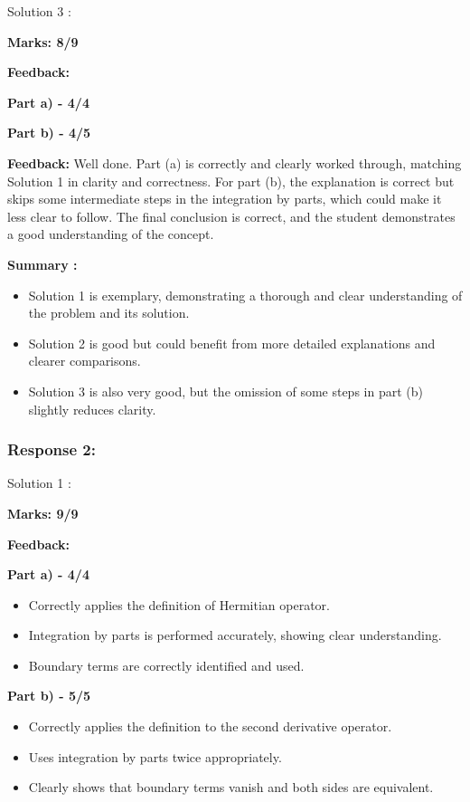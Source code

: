\documentclass[a4paper,11pt]{article}
\begin{document}
Solution 3 :

\textbf{Marks: 8/9}

\textbf{Feedback:}

\textbf{Part a) - 4/4}


\textbf{Part b) - 4/5}


\textbf{Feedback:}
Well done. Part (a) is correctly and clearly worked through, matching Solution 1 in clarity and correctness. For part (b), the explanation is correct but skips some intermediate steps in the integration by parts, which could make it less clear to follow. The final conclusion is correct, and the student demonstrates a good understanding of the concept.


\textbf{Summary :}
\begin{itemize}
    \item Solution 1 is exemplary, demonstrating a thorough and clear understanding of the problem and its solution.
    \item Solution 2 is good but could benefit from more detailed explanations and clearer comparisons.
    \item Solution 3 is also very good, but the omission of some steps in part (b) slightly reduces clarity.
\end{itemize}



\subsubsection*{Response 2:}

Solution 1 :

\textbf{Marks: 9/9}

\textbf{Feedback:}

\textbf{Part a) - 4/4}

\begin{itemize}
    \item Correctly applies the definition of Hermitian operator.
    \item Integration by parts is performed accurately, showing clear understanding.
    \item Boundary terms are correctly identified and used.
\end{itemize}

\textbf{Part b) - 5/5}

\begin{itemize}
    \item Correctly applies the definition to the second derivative operator.
    \item Uses integration by parts twice appropriately.
    \item Clearly shows that boundary terms vanish and both sides are equivalent.
\end{itemize}
\end{document}
